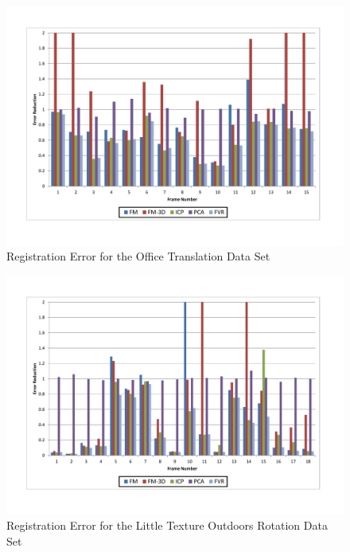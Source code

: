 \begin{figure}[t]
\centering
\includegraphics[width=6.0in]{images/results/Office_Texture_Translation}
\caption{Registration Error for the Office Translation Data Set}
\label{fig:PET12}
\end{figure}

\begin{figure}[t]
\centering
\includegraphics[width=6.0in]{images/results/Outside_No_Texture_Rotation}
\caption{Registration Error for the Little Texture Outdoors Rotation Data Set}
\label{fig:PET13}
\end{figure}

